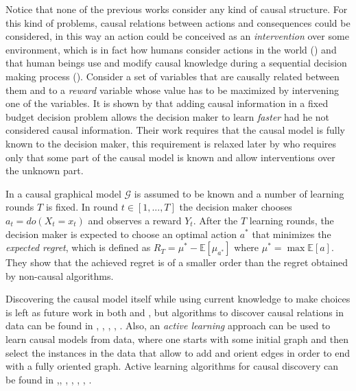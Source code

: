 \documentclass[english,letterpaper,12pt,final]{article}
\theoremstyle{definition}
\begin{document}
Notice that none of the previous works consider any kind of causal structure. For this kind of problems, causal relations between actions and consequences could be considered, in this way an action could be conceived as an \textit{intervention} over some environment, which is in fact how humans consider actions in the world (\cite{hagmayer2009decision}) and that human beings use and modify causal knowledge during a sequential decision making process (\cite{hagmayer2013repeated}). Consider a set of variables that are causally related between them and to a \textit{reward} variable whose value has to be maximized by intervening one of the variables. It is shown by \cite{lattimoreNIPS2016} that adding causal information in a fixed budget decision problem allows the decision maker to learn \textit{faster} had he not considered causal information. Their work requires that the causal model is fully known to the decision maker, this requirement is relaxed later by \cite{sen2017identifying} who requires only that some part of the causal model is known and allow interventions over the unknown part.

In \cite{lattimoreNIPS2016} a causal graphical model $\mathcal{G}$ is assumed to be known and a number of learning rounds $T$ is fixed. In round $t \in [1,...,T]$ the decision maker chooses $a_t=do(X_t = x_t)$ and observes a reward $Y_t$. After the $T$ learning rounds, the decision maker is expected to choose an optimal action $a^\ast$ that minimizes the \textit{expected regret}, which is defined as $R_T= \mu^\ast - \mathbb{E}[\mu_{a^\ast}]$ where $\mu^\ast = \max \mathbb{E}[a]$. They show that the achieved regret is of a smaller order than the regret obtained by non-causal algorithms. 

Discovering the causal model itself while using current knowledge to make choices is left as future work in both \cite{lattimoreNIPS2016} and \cite{sen2017identifying}, but algorithms to discover causal relations in data can be found in \cite{eberhardt2008almost}, \cite{hauser2012two}, \cite{hyttinen2013experiment}, \cite{loh2014high}, \cite{shanmugam2015learning} \cite{mooij2016distinguishing}. Also, an \textit{active learning} approach can be used to learn causal models from data, where one starts with some initial graph and then select the instances in the data that allow to add and orient edges in order to end with a fully oriented graph. Active learning algorithms for causal discovery can be found in \cite{tong2001active},\cite{murphy2001active}, \cite{meganck2006learning}, \cite{he2008active}, \cite{hauser2012two}, \cite{10.1007/978-3-319-56970-3_9}, \cite{rubenstein2017probabilistic}.
\end{document}

